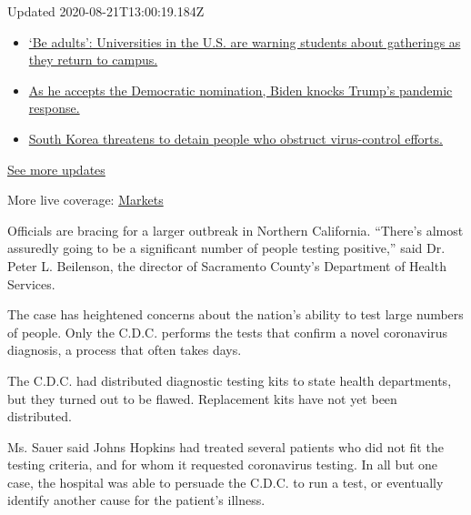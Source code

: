 Updated 2020-08-21T13:00:19.184Z

\begin{itemize}
\tightlist
\item
  \href{https://www.nytimes3xbfgragh.onion/2020/08/21/world/covid-19-coronavirus.html?action=click\&pgtype=Article\&state=default\&region=MAIN_CONTENT_1\&context=storylines_live_updates\#link-6a60a19d}{`Be
  adults': Universities in the U.S. are warning students about
  gatherings as they return to campus.}
\item
  \href{https://www.nytimes3xbfgragh.onion/2020/08/21/world/covid-19-coronavirus.html?action=click\&pgtype=Article\&state=default\&region=MAIN_CONTENT_1\&context=storylines_live_updates\#link-324af071}{As
  he accepts the Democratic nomination, Biden knocks Trump's pandemic
  response.}
\item
  \href{https://www.nytimes3xbfgragh.onion/2020/08/21/world/covid-19-coronavirus.html?action=click\&pgtype=Article\&state=default\&region=MAIN_CONTENT_1\&context=storylines_live_updates\#link-191d44be}{South
  Korea threatens to detain people who obstruct virus-control efforts.}
\end{itemize}

\href{https://www.nytimes3xbfgragh.onion/2020/08/21/world/covid-19-coronavirus.html?action=click\&pgtype=Article\&state=default\&region=MAIN_CONTENT_1\&context=storylines_live_updates}{See
more updates}

More live coverage:
\href{https://www.nytimes3xbfgragh.onion/live/2020/08/21/business/stock-market-today-coronavirus?action=click\&pgtype=Article\&state=default\&region=MAIN_CONTENT_1\&context=storylines_live_updates}{Markets}

Officials are bracing for a larger outbreak in Northern California.
``There's almost assuredly going to be a significant number of people
testing positive,'' said Dr. Peter L. Beilenson, the director of
Sacramento County's Department of Health Services.

The case has heightened concerns about the nation's ability to test
large numbers of people. Only the C.D.C. performs the tests that confirm
a novel coronavirus diagnosis, a process that often takes days.

The C.D.C. had distributed diagnostic testing kits to state health
departments, but they turned out to be flawed. Replacement kits have not
yet been distributed.

Ms. Sauer said Johns Hopkins had treated several patients who did not
fit the testing criteria, and for whom it requested coronavirus testing.
In all but one case, the hospital was able to persuade the C.D.C. to run
a test, or eventually identify another cause for the patient's illness.

